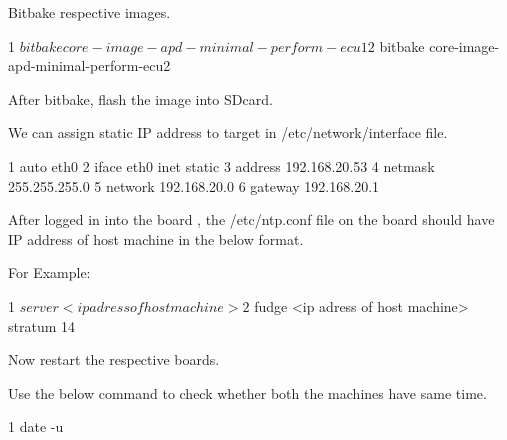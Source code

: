 \begin{DoxyEnumerate}
\item Bitbake respective images. 
\begin{DoxyCode}
1 $ bitbake core-image-apd-minimal-perform-ecu1
2 $ bitbake core-image-apd-minimal-perform-ecu2
\end{DoxyCode}

\item After bitbake, flash the image into S\+Dcard.
\begin{DoxyEnumerate}
\item We can assign static IP address to target in /etc/network/interface file. 
\begin{DoxyCode}
1 auto eth0
2 iface eth0 inet static
3       address 192.168.20.53
4       netmask 255.255.255.0
5       network 192.168.20.0
6       gateway 192.168.20.1
\end{DoxyCode}

\end{DoxyEnumerate}
\item After logged in into the board , the /etc/ntp.conf file on the board should have IP address of host machine in the below format.

For Example\+: 
\begin{DoxyCode}
1 $ server <ip adress of host machine>
2 $ fudge <ip adress of host machine> stratum 14
\end{DoxyCode}

\item Now restart the respective boards.
\item Use the below command to check whether both the machines have same time. 
\begin{DoxyCode}
1 date -u
\end{DoxyCode}


\end{DoxyEnumerate}
